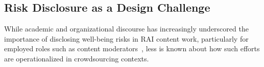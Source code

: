 \subsection{Risk Disclosure as a Design Challenge}
While academic and organizational discourse has increasingly underscored the importance of disclosing well-being risks in RAI content work, particularly for employed roles such as content moderators~\cite{bharucha2023content, qian2025locating}, less is known about how such efforts are operationalized in crowdsourcing contexts. %


